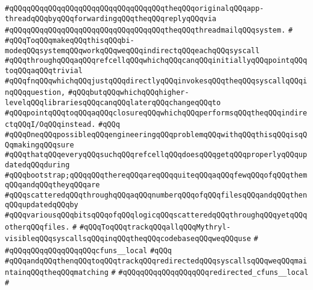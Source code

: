 \verb|#qQQqqQQqqQQqqQQqqQQqqQQqqQQqqQQqqQQqtheqQQqoriginalqQQqapp-threadqQQqbyqQQqforwardingqQQqtheqQQqreplyqQQqvia|\newline
\verb|#qQQqqQQqqQQqqQQqqQQqqQQqqQQqqQQqqQQqtheqQQqthreadmailqQQqsystem.|\newline
\verb|#|\newline
\verb|#qQQqToqQQqmakeqQQqthisqQQqbi-modeqQQqsystemqQQqworkqQQqweqQQqindirectqQQqeachqQQqsyscall|\newline
\verb|#qQQqthroughqQQqaqQQqrefcellqQQqwhichqQQqcanqQQqinitiallyqQQqpointqQQqtoqQQqaqQQqtrivial|\newline
\verb|#qQQqfnqQQqwhichqQQqjustqQQqdirectlyqQQqinvokesqQQqtheqQQqsyscallqQQqinqQQqquestion,|\newline
\verb|#qQQqbutqQQqwhichqQQqhigher-levelqQQqlibrariesqQQqcanqQQqlaterqQQqchangeqQQqto|\newline
\verb|#qQQqpointqQQqtoqQQqaqQQqclosureqQQqwhichqQQqperformsqQQqtheqQQqindirectqQQqI/OqQQqinstead.|\newline
\verb|#qQQq|\newline
\verb|#qQQqOneqQQqpossibleqQQqengineeringqQQqproblemqQQqwithqQQqthisqQQqisqQQqmakingqQQqsure|\newline
\verb|#qQQqthatqQQqeveryqQQqsuchqQQqrefcellqQQqdoesqQQqgetqQQqproperlyqQQqupdatedqQQqduring|\newline
\verb|#qQQqbootstrap;qQQqqQQqthereqQQqareqQQqquiteqQQqaqQQqfewqQQqofqQQqthemqQQqandqQQqtheyqQQqare|\newline
\verb|#qQQqscatteredqQQqthroughqQQqaqQQqnumberqQQqofqQQqfilesqQQqandqQQqthenqQQqupdatedqQQqby|\newline
\verb|#qQQqvariousqQQqbitsqQQqofqQQqlogicqQQqscatteredqQQqthroughqQQqyetqQQqotherqQQqfiles.|\newline
\verb|#|\newline
\verb|#qQQqToqQQqtrackqQQqallqQQqMythryl-visibleqQQqsyscallsqQQqinqQQqtheqQQqcodebaseqQQqweqQQquse|\newline
\verb|#|\newline
\verb|#qQQqqQQqqQQqqQQqqQQqcfuns__local|\newline
\verb|#qQQq|\newline
\verb|#qQQqandqQQqthenqQQqtoqQQqtrackqQQqredirectedqQQqsyscallsqQQqweqQQqmaintainqQQqtheqQQqmatching|\newline
\verb|#|\newline
\verb|#qQQqqQQqqQQqqQQqqQQqredirected_cfuns__local|\newline
\verb|#|\newline
